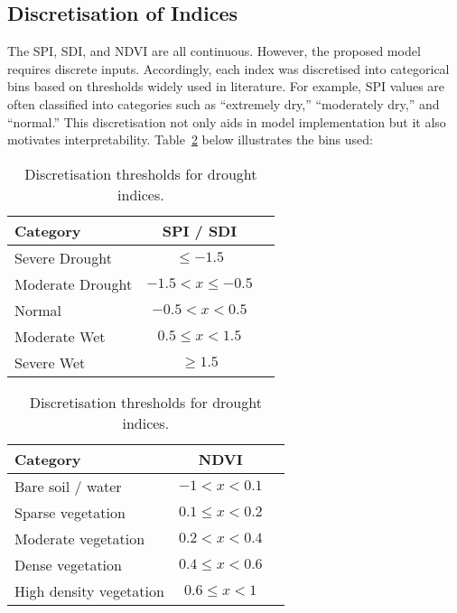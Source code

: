 \subsection{Discretisation of Indices}
The SPI, SDI, and NDVI are all continuous. However, the proposed model requires discrete inputs. Accordingly, each index was discretised into categorical bins based on thresholds widely used in literature. For example, SPI values are often classified into categories such as “extremely dry,” “moderately dry,” and “normal.” This discretisation not only aids in model implementation but it also motivates interpretability. Table~\ref{tbl:discretisation} below illustrates the bins used:
\begin{table}[h]
    \centering
    \caption{Discretisation thresholds for drought indices.}
    \begin{minipage}{0.48\textwidth}
        \centering
        \begin{tabular}{lcc}
            \toprule
            \textbf{Category} & \textbf{SPI / SDI}  \\
            \midrule
            Severe Drought    & $\leq -1.5$        \\
            Moderate Drought  & $-1.5 < x \leq -0.5$ \\
            Normal            & $-0.5 < x < 0.5$  \\
            Moderate Wet      & $0.5 \leq x < 1.5$ \\
            Severe Wet        & $\geq 1.5$        \\
            \bottomrule
        \end{tabular}
    \end{minipage}%
    \hfill
    \begin{minipage}{0.48\textwidth}
        \centering
        \begin{tabular}{lcc}
            \toprule
            \textbf{Category} & \textbf{NDVI} \\
            \midrule
            Bare soil / water    & $-1 < x <  0.1$   \\
            Sparse vegetation  & $0.1 \leq x < 0.2 $\\
            Moderate vegetation            & $0.2 < x < 0.4$    \\
            Dense vegetation      & $0.4 \leq x < 0.6$ \\
            High density vegetation        & $ 0.6 \leq x < 1 $          \\
            \bottomrule
        \end{tabular}
    \end{minipage}
    \label{tbl:discretisation}
\end{table}


